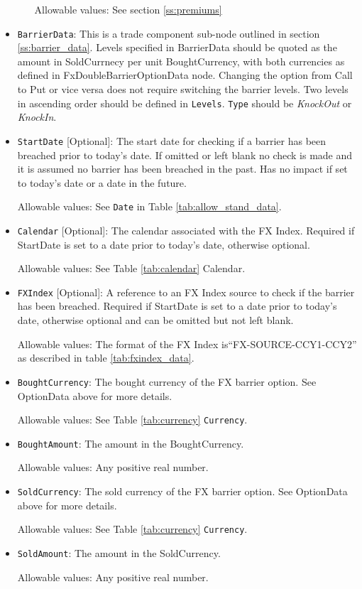 \begin{itemize}
\begin{itemize}
Allowable values:  See section \ref{ss:premiums}

\end{itemize}


\item \lstinline!BarrierData!: This is a trade component sub-node outlined in section \ref{ss:barrier_data}.
Levels specified in BarrierData should be quoted as the amount in SoldCurrnecy per unit BoughtCurrency, with both currencies as defined in FxDoubleBarrierOptionData node.
Changing the option from Call to Put or vice versa does not require switching the barrier levels. Two levels in ascending order should be defined in \lstinline!Levels!. \lstinline!Type! should be \emph{KnockOut} or \emph{KnockIn}.

\item \lstinline!StartDate! [Optional]: The start date for checking if a barrier has been breached prior to today's date.  If omitted or left blank no check is made and it is assumed no barrier has been breached in the past. Has no impact if set to today's date or a date in the future.

Allowable values:  See \lstinline!Date! in Table \ref{tab:allow_stand_data}.

\item \lstinline!Calendar! [Optional]: The calendar associated with the FX Index. Required if StartDate is set to a date prior to today's date, otherwise optional.

Allowable values: See Table \ref{tab:calendar} Calendar.

\item \lstinline!FXIndex! [Optional]: A reference to an FX Index source to check if the barrier has been breached. Required if StartDate is set to a date prior to today's date, otherwise optional and can be omitted but not left blank.

Allowable values:  The format of the FX Index is``FX-SOURCE-CCY1-CCY2'' as described in table \ref{tab:fxindex_data}. 

\item \lstinline!BoughtCurrency!: The bought currency of the FX barrier option. See OptionData above for more details.

Allowable values:  See Table \ref{tab:currency} \lstinline!Currency!.

\item \lstinline!BoughtAmount!: The amount in the BoughtCurrency.  

Allowable values:  Any positive real number.

\item \lstinline!SoldCurrency!: The sold currency of the FX barrier option. See OptionData above for more details.

Allowable values:  See Table \ref{tab:currency} \lstinline!Currency!.

\item \lstinline!SoldAmount!: The amount in the SoldCurrency.  

Allowable values:  Any positive real number.

\end{itemize}